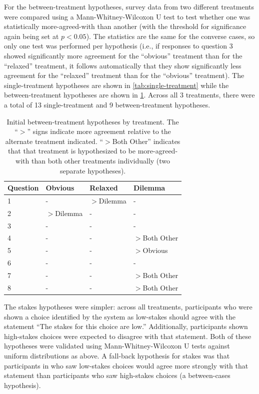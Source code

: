 For the between-treatment hypotheses, survey data from two different treatments were compared using a Mann-Whitney-Wilcoxon U test to test whether one was statistically more-agreed-with than another (with the threshold for significance again being set at $p < 0.05$).
%
The statistics are the same for the converse cases, so only one test was performed per hypothesis (i.e., if responses to question 3 showed significantly more agreement for the ``obvious'' treatment than for the ``relaxed'' treatment, it follows automatically that they show significantly less agreement for the ``relaxed'' treatment than for the ``obvious'' treatment).
%
The single-treatment hypotheses are shown in \cref{tab:single-treatment} while the between-treatment hypotheses are shown in \cref{tab:between-treatments}.
%
Across all 3 treatments, there were a total of 13 single-treatment and 9 between-treatment hypotheses.


\begin{table}
\bgroup
\def\arraystretch{1.1}
\begin{tabular}{p{3.5em} | p{5em} | p{5em} | p{5.5em} |}
Question & Obvious & Relaxed & Dilemma \\
\hline
1 &      -     & $>$Dilemma &      -     \\
\hline
2 & $>$Dilemma &      -     &      -     \\
\hline
3 &      -     &      -     &      -     \\
\hline
4 &      -     &      -     & $>$Both Other \\
\hline
5 &      -     &      -     & $>$Obvious \\
\hline
6 &      -     &      -     &      -     \\
\hline
7 &      -     &      -     & $>$Both Other \\
\hline
8 &      -     &      -     & $>$Both Other \\
\hline
\end{tabular}
\egroup
  \caption{Initial between-treatment hypotheses by treatment. The ``$>$'' signs indicate more agreement relative to the alternate treatment indicated. ``$>$Both Other'' indicates that that treatment is hypothesized to be more-agreed-with than both other treatments individually (two separate hypotheses).}
  \label{tab:between-treatments}
\end{table}


The stakes hypotheses were simpler: across all treatments, participants who were shown a choice identified by the system as low-stakes should agree with the statement ``The stakes for this choice are low.''
%
Additionally, participants shown high-stakes choices were expected to disagree with that statement.
%
Both of these hypotheses were validated using Mann-Whitney-Wilcoxon U tests against uniform distributions as above.
%
A fall-back hypothesis for stakes was that participants in who saw low-stakes choices would agree more strongly with that statement than participants who saw high-stakes choices (a between-cases hypothesis).


